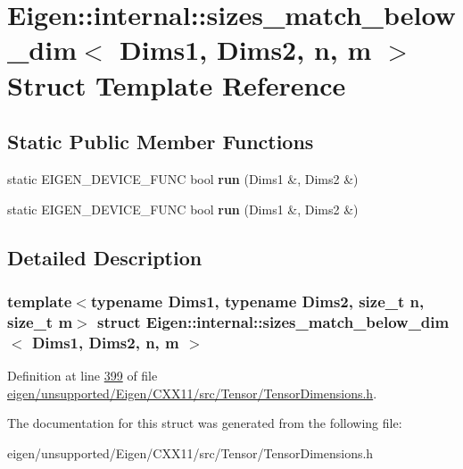 \hypertarget{struct_eigen_1_1internal_1_1sizes__match__below__dim}{}\section{Eigen\+:\+:internal\+:\+:sizes\+\_\+match\+\_\+below\+\_\+dim$<$ Dims1, Dims2, n, m $>$ Struct Template Reference}
\label{struct_eigen_1_1internal_1_1sizes__match__below__dim}
\subsection*{Static Public Member Functions}
\begin{DoxyCompactItemize}
\item 
\mbox{\label{struct_eigen_1_1internal_1_1sizes__match__below__dim_ad77be78c18dce4fdf245781ca7d21f3d}} 
static E\+I\+G\+E\+N\+\_\+\+D\+E\+V\+I\+C\+E\+\_\+\+F\+U\+NC bool {\bfseries run} (Dims1 \&, Dims2 \&)
\item 
\mbox{\label{struct_eigen_1_1internal_1_1sizes__match__below__dim_ad77be78c18dce4fdf245781ca7d21f3d}} 
static E\+I\+G\+E\+N\+\_\+\+D\+E\+V\+I\+C\+E\+\_\+\+F\+U\+NC bool {\bfseries run} (Dims1 \&, Dims2 \&)
\end{DoxyCompactItemize}


\subsection{Detailed Description}
\subsubsection*{template$<$typename Dims1, typename Dims2, size\+\_\+t n, size\+\_\+t m$>$\newline
struct Eigen\+::internal\+::sizes\+\_\+match\+\_\+below\+\_\+dim$<$ Dims1, Dims2, n, m $>$}



Definition at line \hyperlink{eigen_2unsupported_2_eigen_2_c_x_x11_2src_2_tensor_2_tensor_dimensions_8h_source_l00399}{399} of file \hyperlink{eigen_2unsupported_2_eigen_2_c_x_x11_2src_2_tensor_2_tensor_dimensions_8h_source}{eigen/unsupported/\+Eigen/\+C\+X\+X11/src/\+Tensor/\+Tensor\+Dimensions.\+h}.



The documentation for this struct was generated from the following file\+:\begin{DoxyCompactItemize}
\item 
eigen/unsupported/\+Eigen/\+C\+X\+X11/src/\+Tensor/\+Tensor\+Dimensions.\+h\end{DoxyCompactItemize}
